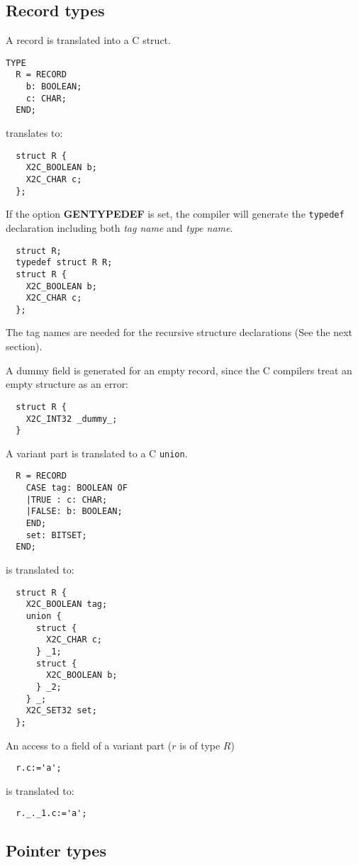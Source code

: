\subsection{Record types}\label{maptoc:types:rec}

A record is translated into a C struct.
\begin{verbatim}
TYPE
  R = RECORD
    b: BOOLEAN;
    c: CHAR;
  END;
\end{verbatim}
translates to:
\begin{verbatim}
  struct R {
    X2C_BOOLEAN b;
    X2C_CHAR c;
  };
\end{verbatim}

If the option {\bf GENTYPEDEF} is set, the compiler will generate
the {\tt typedef} declaration including both {\em tag name} and {\em
type name}.
\begin{verbatim}
  struct R;
  typedef struct R R;
  struct R {
    X2C_BOOLEAN b;
    X2C_CHAR c;
  };
\end{verbatim}
The tag names are needed for the recursive structure
declarations (See the next section).

A dummy field is generated for an empty record, since the C compilers
treat an empty structure as an error:
\begin{verbatim}
  struct R {
    X2C_INT32 _dummy_;
  }
\end{verbatim}
A  variant  part  is translated to a C {\tt union}.
\begin{verbatim}
  R = RECORD
    CASE tag: BOOLEAN OF
    |TRUE : c: CHAR;
    |FALSE: b: BOOLEAN;
    END;
    set: BITSET;
  END;
\end{verbatim}
is translated to:
\begin{verbatim}
  struct R {
    X2C_BOOLEAN tag;
    union {
      struct {
        X2C_CHAR c;
      } _1;
      struct {
        X2C_BOOLEAN b;
      } _2;
    } _;
    X2C_SET32 set;
  };
\end{verbatim}

An access to a field of a variant part ($r$ is of type $R$)
\begin{verbatim}
  r.c:='a';
\end{verbatim}
is translated to:
\begin{verbatim}
  r._._1.c:='a';
\end{verbatim}

\subsection{Pointer types}


